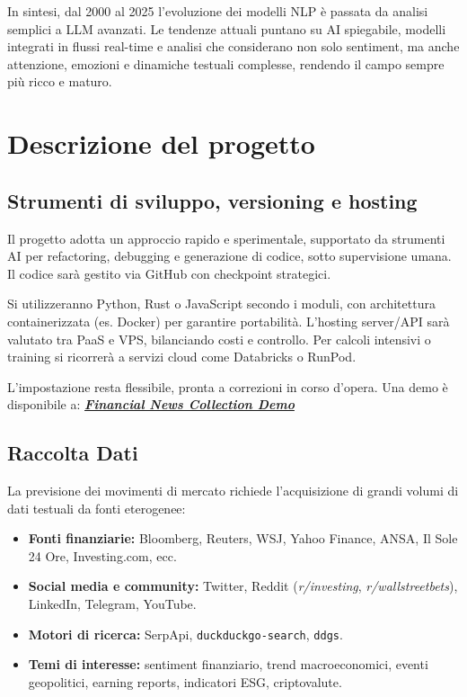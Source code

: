 \documentclass[a4paper,12pt]{article}
\begin{document}
In sintesi, dal 2000 al 2025 l’evoluzione dei modelli NLP è passata da analisi semplici a LLM avanzati. Le tendenze attuali puntano su AI spiegabile, modelli integrati in flussi real-time e analisi che considerano non solo sentiment, ma anche attenzione, emozioni e dinamiche testuali complesse, rendendo il campo sempre più ricco e maturo.

\section{Descrizione del progetto}
\subsection{Strumenti di sviluppo, versioning e hosting}

Il progetto adotta un approccio rapido e sperimentale, supportato da strumenti AI per refactoring, debugging e generazione di codice, sotto supervisione umana. Il codice sarà gestito via GitHub con checkpoint strategici.

Si utilizzeranno Python, Rust o JavaScript secondo i moduli, con architettura containerizzata (es. Docker) per garantire portabilità. L’hosting server/API sarà valutato tra PaaS e VPS, bilanciando costi e controllo. Per calcoli intensivi o training si ricorrerà a servizi cloud come Databricks o RunPod.

L’impostazione resta flessibile, pronta a correzioni in corso d’opera. Una demo è disponibile a:
\href{https://unime01-d9a3b5f15d3b.herokuapp.com/}{\textit{\textbf{Financial News Collection Demo}}}
\subsection{Raccolta Dati}

La previsione dei movimenti di mercato richiede l’acquisizione di grandi volumi di dati testuali da fonti eterogenee:

\begin{itemize}
    \item \textbf{Fonti finanziarie:} Bloomberg, Reuters, WSJ, Yahoo Finance, ANSA, Il Sole 24 Ore, Investing.com, ecc.
    \item \textbf{Social media e community:} Twitter, Reddit (\textit{r/investing}, \textit{r/wallstreetbets}), LinkedIn, Telegram, YouTube.
    \item \textbf{Motori di ricerca:} SerpApi, \texttt{duckduckgo-search}, \texttt{ddgs}.
    \item \textbf{Temi di interesse:} sentiment finanziario, trend macroeconomici, eventi geopolitici, earning reports, indicatori ESG, criptovalute.
\end{itemize}
\end{document}
